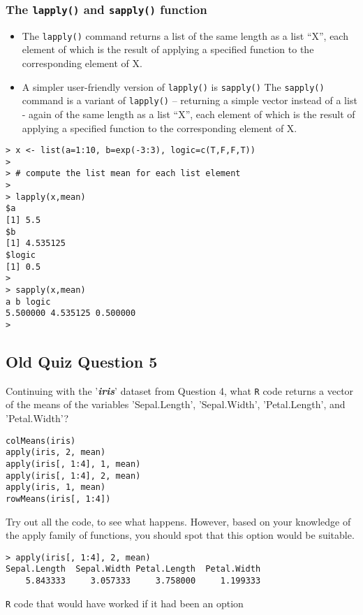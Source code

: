 \documentclass[]{article}
\begin{document}
\subsubsection*{The \texttt{lapply()} and \texttt{sapply()} function}
\begin{itemize}
	\item The \texttt{lapply()} command returns a list of the same length as a list “X”, each element of which is the result of applying a specified function to the corresponding element of X.
	
	\item A simpler user-friendly version of \texttt{lapply()} is \texttt{sapply()}
	The \texttt{sapply()} command is a variant of \texttt{lapply()} – returning a simple vector instead of a list - again of the same length as a list “X”, each element of which is the result of applying a specified function to the corresponding element of X.
\end{itemize}
\begin{verbatim}
> x <- list(a=1:10, b=exp(-3:3), logic=c(T,F,F,T))
>
> # compute the list mean for each list element
>
> lapply(x,mean)
$a
[1] 5.5
$b
[1] 4.535125
$logic
[1] 0.5
>
> sapply(x,mean)
a b logic
5.500000 4.535125 0.500000
>
\end{verbatim}
\subsection*{Old Quiz Question 5} %
Continuing with the '\textit{\textbf{iris}}' dataset from Question 4, what \texttt{R} code returns a vector of the means of the variables 'Sepal.Length', 'Sepal.Width', 'Petal.Length', and 'Petal.Width'?
\begin{framed}
\begin{verbatim}
colMeans(iris)
apply(iris, 2, mean)
apply(iris[, 1:4], 1, mean)
apply(iris[, 1:4], 2, mean)
apply(iris, 1, mean)
rowMeans(iris[, 1:4])
\end{verbatim}
\end{framed}
Try out all the code, to see what happens. However, based on your knowledge of the apply family of functions, you should spot that this option would be suitable.
\begin{verbatim}
> apply(iris[, 1:4], 2, mean)
Sepal.Length  Sepal.Width Petal.Length  Petal.Width 
    5.843333     3.057333     3.758000     1.199333 
\end{verbatim}

\noindent \texttt{R} code that would have worked if it had been an option
\end{document}
